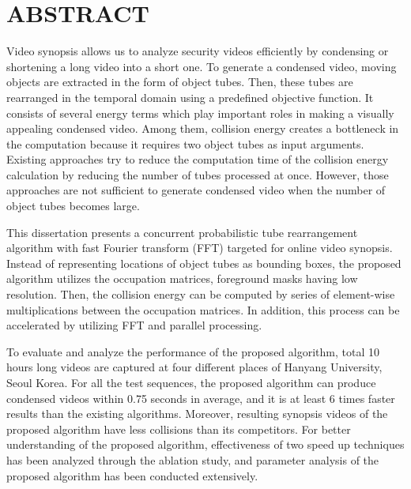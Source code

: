 \documentclass[11pt]{hyu_thesis}
\begin{document}
\restoregeometry
\frontmatter

\tableofcontents
\newpage
\listoffigures
\newpage
\listoftables
\newpage

\mainmatter

\chapter*{ABSTRACT}
Video synopsis allows us to analyze security videos efficiently by condensing or shortening a long video into a short one. To generate a condensed video, moving objects are extracted in the form of object tubes. Then, these tubes are rearranged in the temporal domain using a predefined objective function. It consists of several energy terms which play important roles in making a visually appealing condensed video. Among them, collision energy creates a bottleneck in the computation because it requires two object tubes as input arguments. Existing approaches try to reduce the computation time of the collision energy calculation by reducing the number of tubes processed at once. However, those approaches are not sufficient to generate condensed video when the number of object tubes becomes large.

This dissertation presents a concurrent probabilistic tube rearrangement algorithm with fast Fourier transform (FFT) targeted for online video synopsis. Instead of representing locations of object tubes as bounding boxes, the proposed algorithm utilizes the occupation matrices, foreground masks having low resolution. Then, the collision energy can be computed by series of element-wise multiplications between the occupation matrices. In addition, this process can be accelerated by utilizing FFT and parallel processing.

To evaluate and analyze the performance of the proposed algorithm, total 10 hours long videos are captured at four different places of Hanyang University, Seoul Korea. For all the test sequences, the proposed algorithm can produce condensed videos within 0.75 seconds in average, and it is at least 6 times faster results than the existing algorithms. Moreover, resulting synopsis videos of the proposed algorithm have less collisions than its competitors. For better understanding of the proposed algorithm, effectiveness of two speed up techniques has been analyzed through the ablation study, and parameter analysis of the proposed algorithm has been conducted extensively.
\newpage
\end{document}
